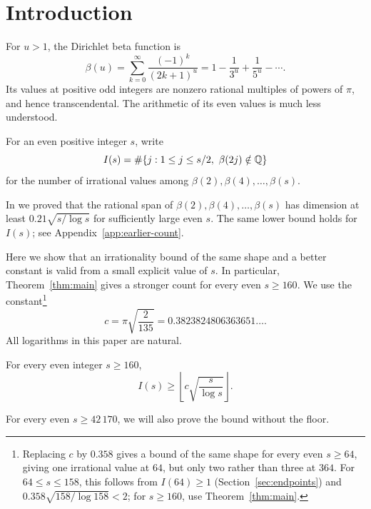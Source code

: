 \section{Introduction}

For $u>1$, the Dirichlet beta function is
\[
 \beta(u)=\sum_{k=0}^{\infty}\frac{(-1)^k}{(2k+1)^u}
         =1-\frac1{3^u}+\frac1{5^u}-\cdots.
\]
Its values at positive odd integers are nonzero rational multiples
of powers of $\pi$, and hence transcendental. The arithmetic of
its even values is much less understood.

For an even positive integer $s$, write
\[
 I(s)=\#\{j:1\le j\le s/2,\ \beta(2j)\notin\Q\}
\]
for the number of irrational values among
$\beta(2),\beta(4),\ldots,\beta(s)$.

In \cite{Tind} we proved that the rational span of
$\beta(2),\beta(4),\ldots,\beta(s)$ has dimension at least
$0.21\sqrt{s/\log s}$ for sufficiently large even $s$.
The same lower bound holds for $I(s)$; see Appendix~\ref{app:earlier-count}.

Here we show that an irrationality bound of the same shape and
a better constant is valid from a small explicit value of $s$.
In particular, Theorem~\ref{thm:main} gives a stronger count for
every even $s\ge160$. We use the constant\footnote{Replacing $c$ by
$0.358$ gives a bound of the same shape for every even $s\ge64$,
giving one irrational value at $64$, but only two rather than three
at $364$. For $64\le s\le158$, this follows from $I(64)\ge1$
(Section~\ref{sec:endpoints}) and
$0.358\sqrt{158/\log158}<2$; for $s\ge160$, use
Theorem~\ref{thm:main}.}
\[
 c=\pi\sqrt{\frac{2}{135}}=0.3823824806363651\ldots.
\]
All logarithms in this paper are natural.

\begin{theorem}\label{thm:main}
For every even integer $s\ge160$,
\begin{equation}\label{eq:main}
 I(s)\ge\left\lfloor c\sqrt{\frac{s}{\log s}}\right\rfloor.
\end{equation}
\end{theorem}
For every even $s\ge42\,170$, we will also prove the bound without the
floor.

